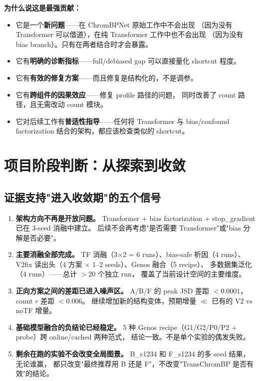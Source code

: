 \documentclass[11pt,a4paper]{ctexart}
\begin{document}
\textbf{为什么说这是最强贡献：}
\begin{itemize}[leftmargin=2em]
  \item 它是一个\textbf{新问题}——在 ChromBPNet 原始工作中不会出现
    （因为没有 Transformer 可以借道），在纯 Transformer 工作中也不会出现
    （因为没有 bias branch）。只有在两者结合时才会暴露。
  \item 它有\textbf{明确的诊断指标}——full/debiased gap 可以直接量化 shortcut 程度。
  \item 它有\textbf{有效的修复方案}——而且修复是结构化的，不是调参。
  \item 它有\textbf{跨组件的因果效应}——修复 profile 路径的问题，
        同时改善了 count 路径，且无需改动 count 模块。
  \item 它对后续工作有\textbf{普适性指导}——任何将 Transformer 与
        bias/confound factorization 结合的架构，都应该检查类似的 shortcut。
\end{itemize}

\section{项目阶段判断：从探索到收敛}
\label{sec:phase}

\subsection{证据支持"进入收敛期"的五个信号}

\begin{enumerate}[leftmargin=2em]
  \item \textbf{架构方向不再是开放问题。}
    Transformer + bias factorization + stop\_gradient 已在 3-seed 消融中建立。
    后续不会再考虑"是否需要 Transformer"或"bias 分解是否必要"。

  \item \textbf{主要消融全部完成。}
    TF 消融（3$\times$2 = 6 runs）、bias-safe 析因（4 runs）、
    V2fix 读出头（4 方案 $\times$ 1--2 seeds）、Genos 融合（5 recipe）、
    多数据集泛化（4 runs）——总计 $>$20 个独立 run，
    覆盖了当前设计空间的主要维度。

  \item \textbf{正向方案之间的差距已进入噪声区。}
    A/B/F 的 peak JSD 差距 $< 0.0001$，count $r$ 差距 $< 0.006$。
    继续增加新的结构变体，预期增量 $\ll$ 已有的 V2 vs noTF 增量。

  \item \textbf{基础模型融合的负结论已经稳定。}
    5 种 Genos recipe（G1/G2/P0/P2 + probe）跨 online/cached 两种范式，
    结论一致。不是单个实验的偶发失败。

  \item \textbf{剩余在跑的实验不会改变全局图景。}
    B\_s1234 和 F\_s1234 的多 seed 结果，无论谁赢，
    都只改变"最终推荐用 B 还是 F"，不改变"TransChromBP 是否有效"的结论。
\end{enumerate}
\end{document}
